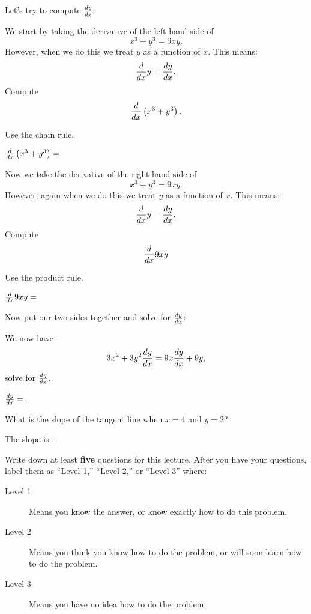 \documentclass{ximera}
\begin{document}
Let's try to compute $\frac{dy}{dx}$:


\begin{question}
We start by taking the derivative of the left-hand side of 
\[
x^3+y^3 = 9xy.
\]
However, when we do this we treat $y$ as a function of $x$. This means:
\[
\frac{d}{dx} y = \frac{dy}{dx}.
\]
Compute 
\[
\frac{d}{dx} \left(x^3+y^3\right).
\]
\begin{hint}
Use the chain rule.
\end{hint}
\begin{prompt}
$\frac{d}{dx} \left(x^3+y^3\right) = $
\end{prompt}
\end{question}

\begin{question}
Now we take the derivative of the right-hand side of 
\[
x^3+y^3 = 9xy.
\]
However, again when we do this we treat $y$ as a function of $x$. This
means:
\[
\frac{d}{dx} y = \frac{dy}{dx}.
\]
Compute 
\[
\frac{d}{dx} 9xy
\]
\begin{hint}
Use the product rule.
\end{hint}
\begin{prompt}
$\frac{d}{dx} 9xy= $
\end{prompt}
\end{question}


\begin{question}
Now put our two sides together and solve for $\frac{dy}{dx}$:
\begin{hint}
We now have 
\[
3x^2 + 3y^2\frac{dy}{dx}= 9x\frac{dy}{dx} + 9y,
\]
solve for $\frac{dy}{dx}$.
\end{hint}
\begin{prompt}
$\frac{dy}{dx}=$.
\end{prompt}
\end{question}


\begin{question}
What is the slope of the tangent line when $x=4$ and $y=2$?
\begin{prompt}
The slope is .
\end{prompt}
\end{question}


\begin{question}
Write down at least \textbf{five} questions for this lecture. After
you have your questions, label them as ``Level 1,'' ``Level 2,'' or ``Level 3'' where:
\begin{description}
\item[Level 1] Means you know the answer, or know exactly how to do this problem.
\item[Level 2] Means you think you know how to do the problem, or will soon learn how to do the problem.
\item[Level 3] Means you have no idea how to do the problem. 
\end{description}
  \begin{freeResponse}
  \end{freeResponse}
\end{question}
\end{document}
